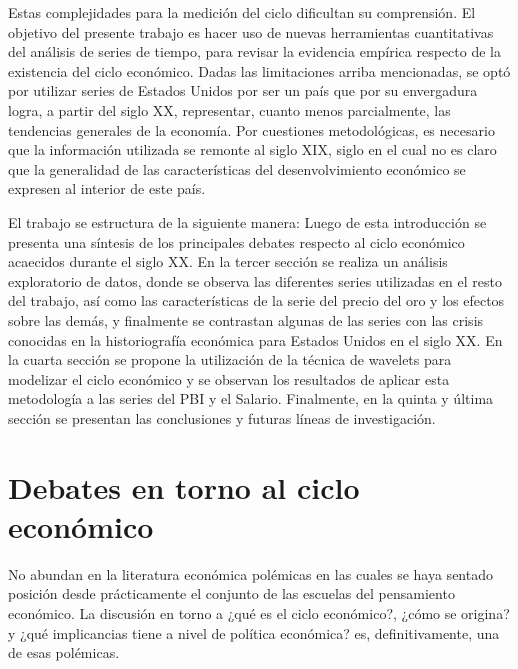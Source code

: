 \documentclass[a4paper]{article}
\begin{document}
Estas complejidades para la medición del ciclo dificultan su comprensión. El objetivo del presente trabajo es hacer uso de nuevas herramientas cuantitativas del análisis de series de tiempo, para revisar la evidencia empírica respecto de la existencia del ciclo económico. Dadas las limitaciones arriba mencionadas, se optó por utilizar series de Estados Unidos por ser un país que por su envergadura logra, a partir del siglo XX, representar, cuanto menos parcialmente, las tendencias generales de la economía. Por cuestiones metodológicas, es necesario que la información utilizada se remonte al siglo XIX, siglo en el cual no es claro que la generalidad de las características del desenvolvimiento económico se expresen al interior de este país. 

El trabajo se estructura de la siguiente manera: Luego de esta introducción se presenta una síntesis de los principales debates respecto al ciclo económico acaecidos durante el siglo XX. En la tercer sección se realiza un análisis exploratorio de datos, donde se observa las diferentes series utilizadas en el resto del trabajo, así como las características de la serie del precio del oro y los efectos sobre las demás, y finalmente se contrastan algunas de las series con las crisis conocidas en la historiografía económica para Estados Unidos en el siglo XX. En la cuarta sección se propone la utilización de la técnica de wavelets para modelizar el ciclo económico y se observan los resultados de aplicar esta metodología a las series del PBI y el Salario. Finalmente, en la quinta y última sección se presentan las conclusiones y futuras líneas de investigación.


\section{Debates en torno al ciclo económico}

No abundan en la literatura económica polémicas en las cuales se haya sentado posición desde prácticamente el conjunto de las escuelas del pensamiento económico. La discusión en torno a ¿qué es el ciclo económico?, ¿cómo se origina?  y ¿qué implicancias tiene a nivel de política económica? es, definitivamente, una de esas polémicas.
\end{document}
